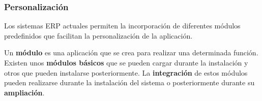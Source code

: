 \subsubsection{Personalización}
Los sistemas ERP actuales permiten la incorporación de diferentes módulos predefinidos que facilitan la personalización de la aplicación.

Un \textbf{módulo} es una aplicación que se crea para realizar una determinada función. Existen unos \textbf{módulos básicos} que se pueden cargar durante la instalación y otros que pueden instalarse posteriormente. La \textbf{integración} de estos módulos pueden realizarse durante la instalación del sistema o posteriormente durante su \textbf{ampliación}.







\glsaddall
\printglossaries


\newpage
{}



